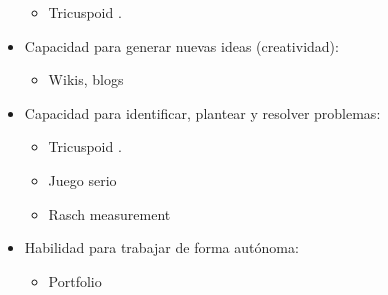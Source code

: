 \begin{itemize}
	\begin{itemize} 
	\item Tricuspoid \cite{Achcaoucaou:2012}.
	\end{itemize}
\item Capacidad para generar nuevas ideas (creatividad):
	\begin{itemize} 
	\item Wikis, blogs \cite{Piedra:2010}
	\end{itemize}
\item Capacidad para identificar, plantear y resolver problemas:
	\begin{itemize} 
	\item Tricuspoid \cite{Achcaoucaou:2012}.
	\item Juego serio \cite{Guenaga:2013}
	\item Rasch measurement \cite{Mohamed:2008a} 
	\end{itemize}
\item Habilidad para trabajar de forma autónoma:
	\begin{itemize} 
	\item Portfolio \cite{Palomares:2011}
	\end{itemize} 
\end{itemize}

